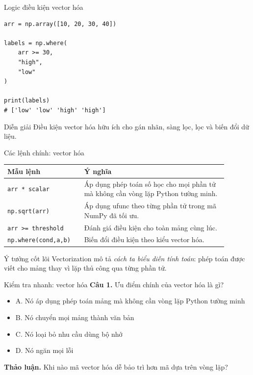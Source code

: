 \documentclass[aspectratio=169,11pt]{beamer}
\newcommand{\quiztitle}[1]{\textbf{\textcolor{QuizOrange}{#1}}}
\begin{document}
\begin{frame}[fragile]{Logic điều kiện vector hóa}
\small
\begin{lstlisting}[style=py]
arr = np.array([10, 20, 30, 40])

labels = np.where(
    arr >= 30,
    "high",
    "low"
)

print(labels)
# ['low' 'low' 'high' 'high']
\end{lstlisting}
\begin{block}{Diễn giải}
Điều kiện vector hóa hữu ích cho gán nhãn, sàng lọc, lọc và biến đổi dữ liệu.
\end{block}
\end{frame}

\begin{frame}{Các lệnh chính: vector hóa}
\small
\begin{tabular}{p{0.30\linewidth}p{0.59\linewidth}}
\toprule
\textbf{Mẫu lệnh} & \textbf{Ý nghĩa} \\
\midrule
\texttt{arr * scalar} & Áp dụng phép toán số học cho mọi phần tử mà không cần vòng lặp Python tường minh. \\
\texttt{np.sqrt(arr)} & Áp dụng ufunc theo từng phần tử trong mã NumPy đã tối ưu. \\
\texttt{arr >= threshold} & Đánh giá điều kiện cho toàn mảng cùng lúc. \\
\texttt{np.where(cond,a,b)} & Biến đổi điều kiện theo kiểu vector hóa. \\
\bottomrule
\end{tabular}
\begin{block}{Ý tưởng cốt lõi}
Vectorization mô tả \emph{cách ta biểu diễn tính toán}: phép toán được viết cho mảng thay vì lặp thủ công qua từng phần tử.
\end{block}
\end{frame}

\begin{frame}{Kiểm tra nhanh: vector hóa}
\small
\quiztitle{Câu 1.} Ưu điểm chính của vector hóa là gì?
\begin{itemize}
  \item A. Nó áp dụng phép toán mảng mà không cần vòng lặp Python tường minh
  \item B. Nó chuyển mọi mảng thành văn bản
  \item C. Nó loại bỏ nhu cầu dùng bộ nhớ
  \item D. Nó ngăn mọi lỗi
\end{itemize}
\vspace{0.8em}
\quiztitle{Thảo luận.} Khi nào mã vector hóa dễ bảo trì hơn mã dựa trên vòng lặp?
\end{frame}
\end{document}
